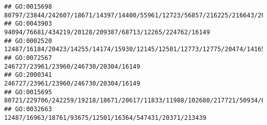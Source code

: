 \documentclass[
]{article}
\begin{document}
\begin{verbatim}
## GO:0015698                                                                                                                                                                                                                                                                                                                80797/23844/242607/18671/14397/14400/55961/12723/56857/216225/216643/20533/22337/224796/24115
## GO:0043903                                                                                                                                                                                                                                                                                                                                                     94094/76681/434219/20128/209387/68713/12265/224762/16149
## GO:0002520                                                                                                                                                                                                                                                                                              12487/16184/20423/14255/14174/15930/12145/12501/12773/12775/20474/14165/100503545/21943/21380/12458/16994/20371
## GO:0072567                                                                                                                                                                                                                                                                                                                                                                        246727/23961/23960/246730/20304/16149
## GO:2000341                                                                                                                                                                                                                                                                                                                                                                        246727/23961/23960/246730/20304/16149
## GO:0015695                                                                                                                                                                                                                                                                                                                            80721/229706/242259/19218/18671/20617/11833/11988/102680/217721/50934/69354/20519
## GO:0032663                                                                                                                                                                                                                                                                                                                                                      12487/16963/18761/93675/12501/16364/547431/20371/213439

\end{verbatim}
\end{document}
